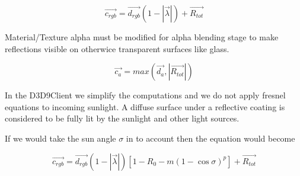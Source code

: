 \documentclass[twocolumn]{report}
\newenvironment{twocol}[0]{%
\begin{list}{}{%
\onecolumn
\setlength{\leftmargin}{0.15cm}%
\setlength{\rightmargin}{0.15cm}%
\setlength{\topmargin}{0cm}%
\setlength{\headheight}{0cm}%
\setlength{\headsep}{0cm}%
\setlength{\textheight}{24cm}%
}%
\item[]}{\end{list}}
\begin{document}
\begin{twocol}
\begin{equation}
\vec{c_{rgb}} = \vec{d_{rgb}}(1-|\vec{\lambda}|) + \vec{R_{tot}}
\end{equation}

Material/Texture alpha must be modified for alpha blending stage to make reflections visible on otherwice transparent surfaces like glass. 

\begin{equation}
\vec{c_{a}} = max(\vec{d_a}, |\vec{R_{tot}}|)
\end{equation}

In the D3D9Client we simplify the computations and we do not apply fresnel equations to incoming sunlight. A diffuse surface under a reflective coating is considered to be fully lit by the sunlight and other light sources. 

If we would take the sun angle $\sigma$ in to account then the equation would become

\begin{equation}
\vec{c_{rgb}} = \vec{d_{rgb}}(1-|\vec{\lambda}|)[1-R_0-m(1-\cos\sigma)^p] + \vec{R_{tot}}
\end{equation}

\end{twocol}
\end{document}
